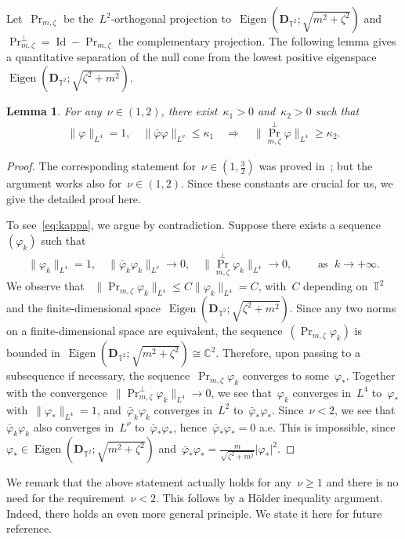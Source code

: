 \documentclass[11pt,final]{amsart}
\newcommand{\C}{\mathbb{C}}
\newcommand{\T}{\mathbb{T}}
\newcommand{\pD}{\mathbf{D}}
\DeclareMathOperator{\Eigen}{Eigen}
\DeclareMathOperator{\id}{Id}
\DeclareMathOperator{\proj}{Pr}
\newtheorem{lemma}[thm]{Lemma}
\begin{document}
Let~$\proj_{m,\zeta}$ be the~$L^2$-orthogonal projection to~$\Eigen(\pD_{\T^2};\sqrt{m^2+\zeta^2})$ and~$\proj_{m,\zeta}^\perp = \id -\proj_{m,\zeta}$ the complementary projection.
The following lemma gives a quantitative separation of the null cone from the lowest positive eigenspace~$\Eigen(\pD_{\T^2};\sqrt{\zeta^2+m^2})$. 
\begin{lemma}\label{lemma:null-cone-separation}
    For any~$\nu\in (1,2)$, there exist~$\kappa_1>0$ and~$\kappa_2>0$ such that
    \begin{align}\label{eq:kappa}
        \|\varphi\|_{L^4}=1,\quad \|\bar{\varphi} \varphi\|_{L^\nu}\leq\kappa_1 \quad\Longrightarrow\quad \|\proj_{m,\zeta}^\perp \varphi\|_{L^4}\geq\kappa_2.
    \end{align}
\end{lemma}
\begin{proof}
    The corresponding statement for~$\nu\in(1,\frac{3}{2})$ was proved in~\cite{WZ2026Stationary}; but the argument works also for~$\nu\in (1,2)$.  
    Since these constants are crucial for us, we give the detailed proof here. 
    
    To see~\eqref{eq:kappa}, we argue by contradiction. 
    Suppose  there exists a sequence~$(\varphi_k)$ such that
    \begin{align}
        \|\varphi_k\|_{L^4}=1, \quad \|\bar{\varphi}_k\varphi_k\|_{L^\nu} \to 0,
        \quad \|\proj_{m,\zeta}^\perp \varphi_k\|_{L^4}\to 0, \qquad \mbox{ as } \; k\to+\infty.
    \end{align}
    We observe that ~$\|\proj_{m,\zeta}\varphi_k\|_{L^4}\leq C\|\varphi_k\|_{L^4}=C$, with~$C$ depending on~$\T^2$ and the finite-dimensional space~$\Eigen(\pD_{\T^2};\sqrt{\zeta^2+m^2})$. 
    Since any two norms on a finite-dimensional space are equivalent, the sequence~$(\proj_{m,\zeta}\varphi_k)$ is bounded in~$\Eigen(\pD_{\T^2};\sqrt{m^2+\zeta^2})\cong\C^2$. 
    Therefore, upon passing to a subsequence if necessary, the sequence~$\proj_{m,\zeta}\varphi_k$ converges to some~$\varphi_{*}$.
    Together with the convergence~$\|\proj_{m,\zeta}^\perp \varphi_k\|_{L^4}\to0$, we see that~$\varphi_k$ converges in~$L^4$ to~$\varphi_*$ with~$\|\varphi_{*}\|_{L^4}=1$, and~$\bar{\varphi}_k\varphi_k$ converges in~$L^2$ to~$\bar{\varphi}_*\varphi_*$. 
    Since~$\nu<2$, we see that~$\bar{\varphi}_k\varphi_k$ also converges in~$L^\nu$ to~$\bar{\varphi}_*\varphi_*$, hence~$\bar{\varphi}_*\varphi_*=0$ a.e. 
    This is impossible, since~$\varphi_*\in\Eigen(\pD_{\T^2};\sqrt{m^2+\zeta^2})$ and~$\bar{\varphi}_*\varphi_*= \frac{m}{\sqrt{\zeta^2 + m^2}}|\varphi_*|^2$.
    
\end{proof}
      We remark that the above statement actually holds for any~$\nu\geq 1$ and there is no need for the requirement~$\nu<2$.
      This follows by a H\"older inequality argument. 
      Indeed, there holds an even more general principle. 
      We state it here for future reference. 
\end{document}
